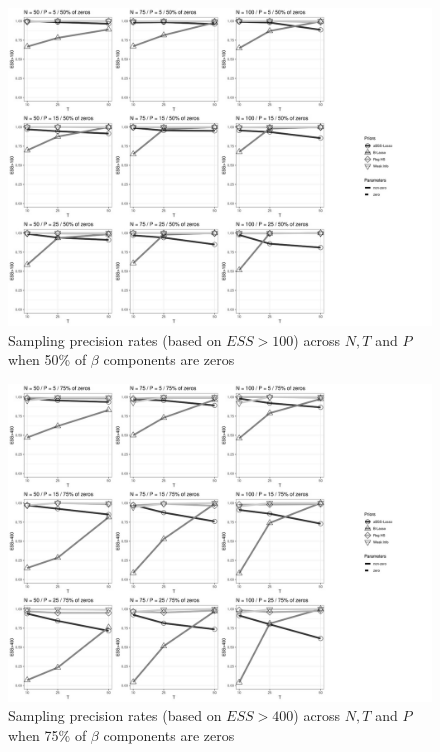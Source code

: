 \documentclass[a4paper,12pt]{article}
\begin{document}
\begin{figure}[]
\centering 
\includegraphics[width=18cm]{Prec100_nz50_beta.jpg}
\caption{Sampling precision rates (based on $ESS>100$) across $N, T$ and $P$ when 50\% of $\beta$ components are zeros}
\label{fig:Prec100_nz50}
\end{figure}

\clearpage
\begin{figure}[]
\centering 
\includegraphics[width=18cm]{Prec400_nz25_beta.jpg}
\caption{Sampling precision rates (based on $ESS>400$) across $N, T$ and $P$ when 75\% of $\beta$ components are zeros}
\label{fig:Prec400_nz25}
\end{figure}
\end{document}
